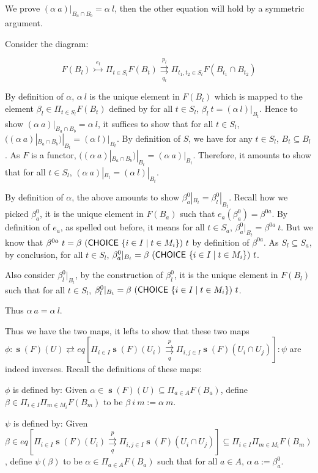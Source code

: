 \documentclass[a4paper]{article}
\DeclareMathOperator{\s}{\mathbf s}
\DeclareMathOperator{\CHOICE}{\sf CHOICE}
\begin{document}
We prove $(\alpha \ a)|_{B_a\cap B_b}=\alpha \ l$, then the other equation will hold by a symmetric argument. 

Consider the diagram:

\[F(B_l)\overset{e_l}\rightarrowtail\Pi_{t\in S_l}F(B_t)\overset{p_l}{\underset{q_l}\rightrightarrows}\Pi_{t_1,t_2\in S_l}F(B_{t_1}\cap B_{t_2})\]

By definition of $\alpha$, $\alpha \ l$ is the unique element in $F(B_l)$ which is mapped to the element $\beta_l\in \Pi_{t\in S_l}F(B_t)$ defined by for all $t\in S_l$, $\beta_l\ t = (\alpha \ l)|_{B_t}$. Hence to show $(\alpha \ a)|_{B_a\cap B_b}=\alpha \ l$, it suffices to show that for all $t \in S_l$, $((\alpha \ a)|_{B_a\cap B_b})|_{B_t}=(\alpha \ l)|_{B_t}$. By definition of $S$, we have for any $t\in S_l$, $B_t\subseteq B_l$. As $F$ is a functor, $((\alpha \ a)|_{B_a\cap B_b})|_{B_t}= (\alpha \ a)|_{B_t}$. Therefore, it amounts to show that for all $t \in S_l$, $(\alpha \ a)|_{B_t}=(\alpha \ l)|_{B_t}$. 

By definition of $\alpha$, the above amounts to show $\beta^0_a|_{B_t}=\beta^0_l|_{B_t}$. Recall how we picked $\beta^0_a$, it is the unique element in $F(B_a)$ such that $e_a(\beta^0_a)=\beta^{0a}$. By definition of $e_a$, as spelled out before, it means for all $t\in S_a$, $\beta^0_a|_{B_t}=\beta^{0a} \ t$. But we know that $\beta^{0a}\ t = \beta \ (\CHOICE \ \{i\in I\mid t \in M_i\}) \ t$ by definition of $\beta^{0a}$. As $S_l\subseteq S_a$, by conclusion, for all $t\in S_l$, $\beta^0_a|_{B_t} = \beta \ (\CHOICE \ \{i\in I\mid t \in M_i\}) \ t$. 

Also consider $\beta^0_l|_{B_t}$, by the construction of $\beta^0_l$, it is the unique element in $F(B_l)$ such that for all $t\in S_l$, $\beta^0_l|_{B_t}=\beta  \ (\CHOICE \ \{i\in I\mid t \in M_i\}) \ t$.

Thus $\alpha \ a =\alpha \ l$.

Thus we have the two maps, it lefts to show that these two maps $\phi:\s(F)(U)\rightleftarrows eq[\Pi_{i\in I}\s(F)(U_i)\overset{p}{\underset{q}\rightrightarrows}\Pi_{i,j\in I}\s(F)(U_i\cap U_j)] :\psi$ are indeed inverses. Recall the definitions of these maps:

$\phi$ is defined by: Given $\alpha\in \s(F)(U)\subseteq \Pi_{a\in A}F(B_a)$, define $\beta\in \Pi_{i\in I}\Pi_{m\in M_i}F(B_m)$ to be $\beta \ i \ m := \alpha \ m$.

$\psi$ is defined by: Given $\beta\in eq[\Pi_{i\in I}\s(F)(U_i)\overset{p}{\underset{q}\rightrightarrows}\Pi_{i,j\in I}\s(F)(U_i\cap U_j)] \subseteq \Pi_{i\in I}\Pi_{m\in M_i}F(B_m)$, define $\psi (\beta)$ to be $\alpha\in \Pi_{a\in A}F(B_a)$ such that for all $a\in A$, $\alpha \ a := \beta^0_a$.
\end{document}
